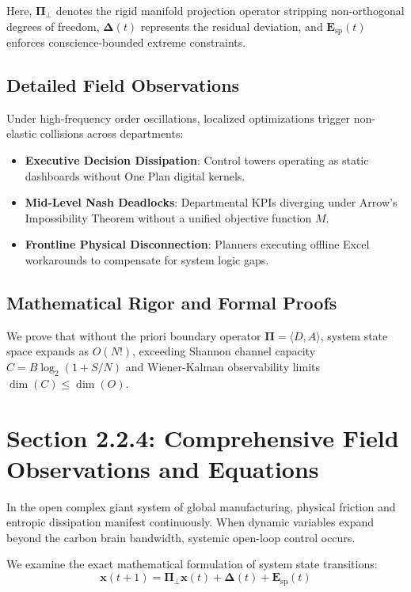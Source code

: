 \documentclass[12pt,a4paper,oneside]{book}
\begin{document}
Here, $\mathbf{\Pi}_{\bot}$ denotes the rigid manifold projection operator stripping non-orthogonal degrees of freedom, $\mathbf{\Delta}(t)$ represents the residual deviation, and $\mathbf{E}_{\mathrm{sp}}(t)$ enforces conscience-bounded extreme constraints.

\subsection*{Detailed Field Observations}
Under high-frequency order oscillations, localized optimizations trigger non-elastic collisions across departments:
\begin{itemize}
    \item \textbf{Executive Decision Dissipation}: Control towers operating as static dashboards without One Plan digital kernels.
    \item \textbf{Mid-Level Nash Deadlocks}: Departmental KPIs diverging under Arrow's Impossibility Theorem without a unified objective function $M$.
    \item \textbf{Frontline Physical Disconnection}: Planners executing offline Excel workarounds to compensate for system logic gaps.
\end{itemize}

\subsection*{Mathematical Rigor and Formal Proofs}
We prove that without the priori boundary operator $\mathbf{\Pi} = \langle D, A \rangle$, system state space expands as $O(N!)$, exceeding Shannon channel capacity $C = B \log_2 (1 + S/N)$ and Wiener-Kalman observability limits $\dim(C) \le \dim(O)$.
\clearpage
\section{Section 2.2.4: Comprehensive Field Observations and Equations}

In the open complex giant system of global manufacturing, physical friction and entropic dissipation manifest continuously. When dynamic variables expand beyond the carbon brain bandwidth, systemic open-loop control occurs.

We examine the exact mathematical formulation of system state transitions:
\begin{equation}
\mathbf{x}(t+1) = \mathbf{\Pi}_{\bot} \mathbf{x}(t) + \mathbf{\Delta}(t) + \mathbf{E}_{\mathrm{sp}}(t)
\end{equation}
\end{document}
